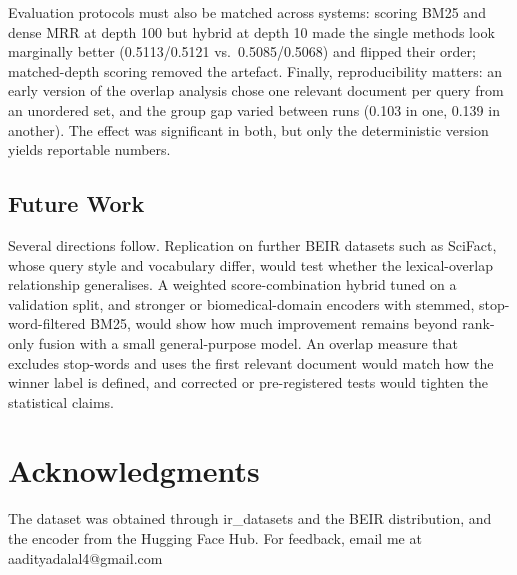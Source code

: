\documentclass[10pt,letterpaper,twocolumn]{article}
\begin{document}
Evaluation protocols must also be matched across systems: scoring BM25 and dense MRR at depth 100 but hybrid at depth 10 made the single methods look marginally better (0.5113/0.5121 vs.\ 0.5085/0.5068) and flipped their order; matched-depth scoring removed the artefact. Finally, reproducibility matters: an early version of the overlap analysis chose one relevant document per query from an unordered set, and the group gap varied between runs (0.103 in one, 0.139 in another). The effect was significant in both, but only the deterministic version yields reportable numbers.

\subsection{Future Work}
Several directions follow. Replication on further BEIR datasets such as SciFact, whose query style and vocabulary differ, would test whether the lexical-overlap relationship generalises. A weighted score-combination hybrid tuned on a validation split, and stronger or biomedical-domain encoders with stemmed, stop-word-filtered BM25, would show how much improvement remains beyond rank-only fusion with a small general-purpose model. An overlap measure that excludes stop-words and uses the first relevant document would match how the winner label is defined, and corrected or pre-registered tests would tighten the statistical claims.

\section{Acknowledgments}
The dataset was obtained through ir\_datasets and the BEIR distribution, and the encoder from the Hugging Face Hub. For feedback, email me at aadityadalal4@gmail.com
\end{document}
